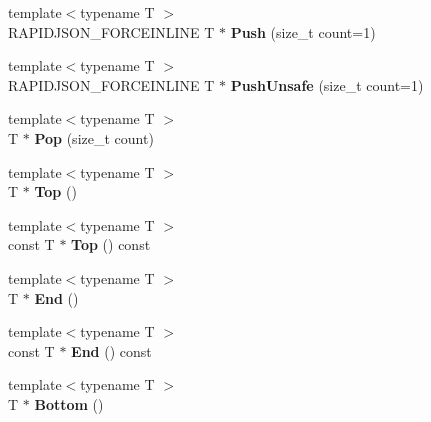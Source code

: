 \begin{DoxyCompactItemize}
\item 
\mbox{\label{classinternal_1_1Stack_a8038223ec0ed6ea92bb5f48e645a25ca}} 
{\footnotesize template$<$typename T $>$ }\\R\+A\+P\+I\+D\+J\+S\+O\+N\+\_\+\+F\+O\+R\+C\+E\+I\+N\+L\+I\+NE T $\ast$ {\bfseries Push} (size\+\_\+t count=1)
\item 
\mbox{\label{classinternal_1_1Stack_a63b4eabd209d4fc9b43027f4e5660532}} 
{\footnotesize template$<$typename T $>$ }\\R\+A\+P\+I\+D\+J\+S\+O\+N\+\_\+\+F\+O\+R\+C\+E\+I\+N\+L\+I\+NE T $\ast$ {\bfseries Push\+Unsafe} (size\+\_\+t count=1)
\item 
\mbox{\label{classinternal_1_1Stack_a8545a8ccba595ac6e4ade9784474aa1c}} 
{\footnotesize template$<$typename T $>$ }\\T $\ast$ {\bfseries Pop} (size\+\_\+t count)
\item 
\mbox{\label{classinternal_1_1Stack_ab3ed5b4afed3c73c516678516d5e195b}} 
{\footnotesize template$<$typename T $>$ }\\T $\ast$ {\bfseries Top} ()
\item 
\mbox{\label{classinternal_1_1Stack_abd8941a6b827a7ea359cb59b79d7a886}} 
{\footnotesize template$<$typename T $>$ }\\const T $\ast$ {\bfseries Top} () const
\item 
\mbox{\label{classinternal_1_1Stack_a54987ae8ad774dd3ee80a43d268ef080}} 
{\footnotesize template$<$typename T $>$ }\\T $\ast$ {\bfseries End} ()
\item 
\mbox{\label{classinternal_1_1Stack_a605246623b39f9d36d3d12eee25f9d82}} 
{\footnotesize template$<$typename T $>$ }\\const T $\ast$ {\bfseries End} () const
\item 
\mbox{\label{classinternal_1_1Stack_a10aa1bc716b82cb0a40b3a3b9d5efe87}} 
{\footnotesize template$<$typename T $>$ }\\T $\ast$ {\bfseries Bottom} ()

\end{DoxyCompactItemize}
